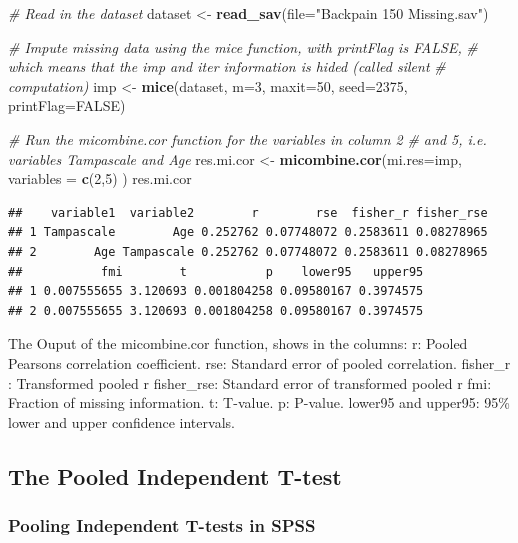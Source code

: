 \documentclass[]{book}
\newenvironment{Shaded}{\begin{snugshade}}{\end{snugshade}}
\newcommand{\KeywordTok}[1]{\textcolor[rgb]{0.13,0.29,0.53}{\textbf{#1}}}
\newcommand{\DataTypeTok}[1]{\textcolor[rgb]{0.13,0.29,0.53}{#1}}
\newcommand{\DecValTok}[1]{\textcolor[rgb]{0.00,0.00,0.81}{#1}}
\newcommand{\StringTok}[1]{\textcolor[rgb]{0.31,0.60,0.02}{#1}}
\newcommand{\CommentTok}[1]{\textcolor[rgb]{0.56,0.35,0.01}{\textit{#1}}}
\newcommand{\OtherTok}[1]{\textcolor[rgb]{0.56,0.35,0.01}{#1}}
\newcommand{\NormalTok}[1]{#1}
\begin{document}
\begin{Shaded}
\begin{Highlighting}[]
\CommentTok{# Read in the dataset }
\NormalTok{dataset <-}\StringTok{ }\KeywordTok{read_sav}\NormalTok{(}\DataTypeTok{file=}\StringTok{"Backpain 150 Missing.sav"}\NormalTok{)}

\CommentTok{# Impute missing data using the mice function, with printFlag is FALSE, }
\CommentTok{# which means that the imp and iter information is hided (called silent }
\CommentTok{# computation)}
\NormalTok{imp <-}\StringTok{ }\KeywordTok{mice}\NormalTok{(dataset, }\DataTypeTok{m=}\DecValTok{3}\NormalTok{, }\DataTypeTok{maxit=}\DecValTok{50}\NormalTok{, }\DataTypeTok{seed=}\DecValTok{2375}\NormalTok{, }\DataTypeTok{printFlag=}\OtherTok{FALSE}\NormalTok{)}

\CommentTok{# Run the micombine.cor function for the variables in column 2 }
\CommentTok{# and 5, i.e. variables Tampascale and Age}
\NormalTok{res.mi.cor <-}\StringTok{ }\KeywordTok{micombine.cor}\NormalTok{(}\DataTypeTok{mi.res=}\NormalTok{imp, }\DataTypeTok{variables =} \KeywordTok{c}\NormalTok{(}\DecValTok{2}\NormalTok{,}\DecValTok{5}\NormalTok{) )}
\NormalTok{res.mi.cor}
\end{Highlighting}
\end{Shaded}

\begin{verbatim}
##    variable1  variable2        r        rse  fisher_r fisher_rse
## 1 Tampascale        Age 0.252762 0.07748072 0.2583611 0.08278965
## 2        Age Tampascale 0.252762 0.07748072 0.2583611 0.08278965
##           fmi        t           p    lower95   upper95
## 1 0.007555655 3.120693 0.001804258 0.09580167 0.3974575
## 2 0.007555655 3.120693 0.001804258 0.09580167 0.3974575
\end{verbatim}

The Ouput of the micombine.cor function, shows in the columns: r: Pooled
Pearsons correlation coefficient. rse: Standard error of pooled
correlation. fisher\_r : Transformed pooled r fisher\_rse: Standard
error of transformed pooled r fmi: Fraction of missing information. t:
T-value. p: P-value. lower95 and upper95: 95\% lower and upper
confidence intervals.

\subsection{The Pooled Independent
T-test}\label{the-pooled-independent-t-test}

\subsubsection{Pooling Independent T-tests in
SPSS}\label{pooling-independent-t-tests-in-spss}
\end{document}
